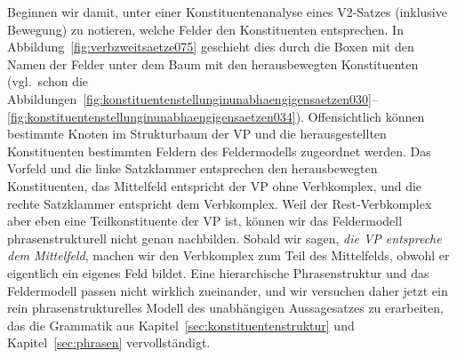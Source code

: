 Beginnen wir damit, unter einer Konstituentenanalyse eines V2-Satzes (inklusive Bewegung) zu notieren, welche Felder den Konstituenten entsprechen.
In Abbildung~\ref{fig:verbzweitsaetze075} geschieht dies durch die Boxen mit den Namen der Felder unter dem Baum mit den herausbewegten Konstituenten (vgl.\ schon die Abbildungen~\ref{fig:konstituentenstellunginunabhaengigensaetzen030}--\ref{fig:konstituentenstellunginunabhaengigensaetzen034}).
Offensichtlich können bestimmte Knoten im Strukturbaum der VP und die herausgestellten Konstituenten bestimmten Feldern des Feldermodells zugeordnet werden.
Das Vorfeld und die linke Satzklammer entsprechen den herausbewegten Konstituenten, das Mittelfeld entspricht der VP ohne Verbkomplex, und die rechte Satzklammer entspricht dem Verbkomplex.
Weil der Rest-Verbkomplex aber eben eine Teilkonstituente der VP ist, können wir das Feldermodell phrasenstrukturell nicht genau nachbilden.
Sobald wir sagen, \textit{die VP entspreche dem Mittelfeld}, machen wir den Verbkomplex zum Teil des Mittelfelds, obwohl er eigentlich ein eigenes Feld bildet.
Eine hierarchische Phrasenstruktur und das Feldermodell passen nicht wirklich zueinander, und wir versuchen daher jetzt ein rein phrasenstrukturelles Modell des unabhängigen Aussagesatzes zu erarbeiten, das die Grammatik aus Kapitel~\ref{sec:konstituentenstruktur} und Kapitel~\ref{sec:phrasen} vervollständigt.

